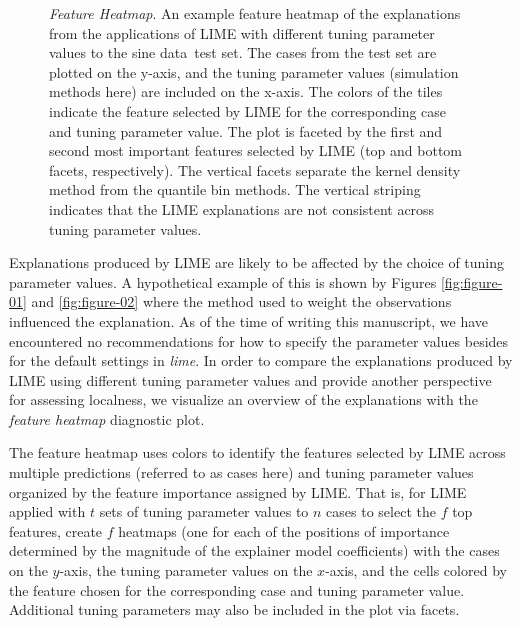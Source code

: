 \documentclass[AMS,STIX2COL]{WileyNJD-v2}\usepackage[]{graphicx}\usepackage[]{color}
\newenvironment{knitrout}{}{} %
\newcommand{\data}{sine data}
\begin{document}
\begin{figure}[!thp]
\begin{knitrout}
\end{knitrout}
\caption{\emph{Feature Heatmap}. An example feature heatmap of the explanations from the applications of LIME with different tuning parameter values to the \data \ test set. The cases from the test set are plotted on the y-axis, and the tuning parameter values (simulation methods here) are included on the x-axis. The colors of the tiles indicate the feature selected by LIME for the corresponding case and tuning parameter value. The plot is faceted by the first and second most important features selected by LIME (top and bottom facets, respectively). The vertical facets separate the  kernel density method from the quantile bin methods. The vertical striping indicates that the LIME explanations are not consistent across tuning parameter values.}
\label{fig:figure-06}
\end{figure}

Explanations produced by LIME are likely to be affected by the choice of tuning parameter values. A hypothetical example of this is shown by Figures \ref{fig:figure-01} and \ref{fig:figure-02} where the method used to weight the observations influenced the explanation. As of the time of writing this manuscript, we have encountered no recommendations for how to specify the parameter values besides for the default settings in \emph{lime}. In order to compare the explanations produced by LIME using different tuning parameter values and provide another perspective for assessing localness, we visualize an overview of the explanations with the \emph{feature heatmap} diagnostic plot. 

The feature heatmap uses colors to identify the features selected by LIME across multiple predictions (referred to as cases here) and tuning parameter values organized by the  feature importance assigned by LIME. That is, for LIME applied with $t$ sets of tuning parameter values to $n$ cases to select the $f$ top features, create $f$ heatmaps (one for each of the positions of importance determined by the magnitude of the explainer model coefficients) with the cases on the $y$-axis, the tuning parameter values on the $x$-axis, and the cells colored by the feature chosen for the corresponding case and tuning parameter value. Additional tuning parameters may also be included in the plot via facets.
\end{document}
